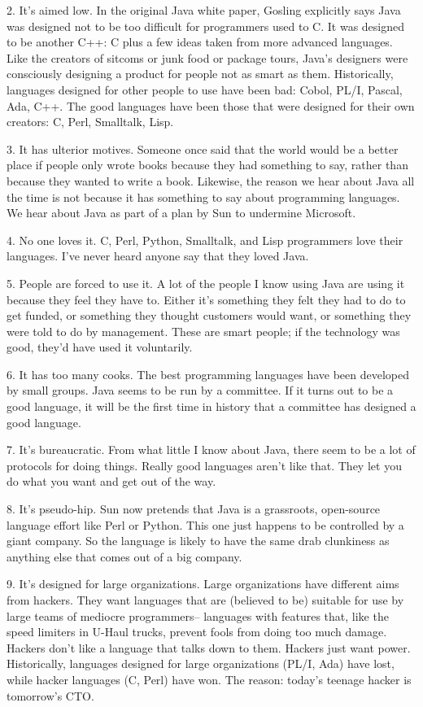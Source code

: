 \documentclass[12pt]{book}
\begin{document}
2. It's aimed low. In the original Java white paper, Gosling explicitly
says Java was designed not to be too difficult for programmers used to
C. It was designed to be another C++: C plus a few ideas taken from more
advanced languages. Like the creators of sitcoms or junk food or package
tours, Java's designers were consciously designing a product for people
not as smart as them. Historically, languages designed for other people
to use have been bad: Cobol, PL/I, Pascal, Ada, C++. The good languages
have been those that were designed for their own creators: C, Perl,
Smalltalk, Lisp.

3. It has ulterior motives. Someone once said that the world would be a
better place if people only wrote books because they had something to
say, rather than because they wanted to write a book. Likewise, the
reason we hear about Java all the time is not because it has something
to say about programming languages. We hear about Java as part of a plan
by Sun to undermine Microsoft.

4. No one loves it. C, Perl, Python, Smalltalk, and Lisp programmers
love their languages. I've never heard anyone say that they loved Java.

5. People are forced to use it. A lot of the people I know using Java
are using it because they feel they have to. Either it's something they
felt they had to do to get funded, or something they thought customers
would want, or something they were told to do by management. These are
smart people; if the technology was good, they'd have used it
voluntarily.

6. It has too many cooks. The best programming languages have been
developed by small groups. Java seems to be run by a committee. If it
turns out to be a good language, it will be the first time in history
that a committee has designed a good language.

7. It's bureaucratic. From what little I know about Java, there seem to
be a lot of protocols for doing things. Really good languages aren't
like that. They let you do what you want and get out of the way.

8. It's pseudo-hip. Sun now pretends that Java is a grassroots,
open-source language effort like Perl or Python. This one just happens
to be controlled by a giant company. So the language is likely to have
the same drab clunkiness as anything else that comes out of a big
company.

9. It's designed for large organizations. Large organizations have
different aims from hackers. They want languages that are (believed to
be) suitable for use by large teams of mediocre programmers-- languages
with features that, like the speed limiters in U-Haul trucks, prevent
fools from doing too much damage. Hackers don't like a language that
talks down to them. Hackers just want power. Historically, languages
designed for large organizations (PL/I, Ada) have lost, while hacker
languages (C, Perl) have won. The reason: today's teenage hacker is
tomorrow's CTO.
\end{document}
